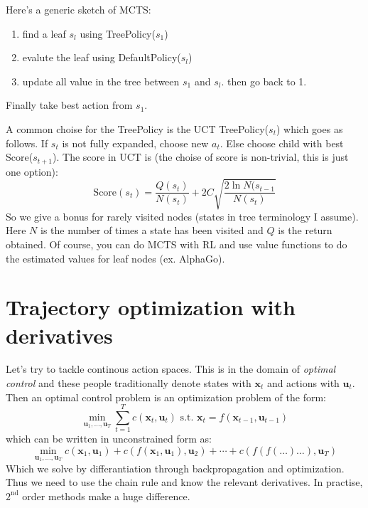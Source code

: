 \documentclass{report}
\begin{document}
Here's a generic sketch of MCTS:
\begin{enumerate}
		\item find a leaf $s_l$ using TreePolicy($s_1$)
		\item evalute the leaf using DefaultPolicy($s_l$)
		\item update all value in the tree between $s_1$ and $s_l$. then go back to 1.
\end{enumerate}
Finally take best action from $s_1$.

A common choise for the TreePolicy is the UCT TreePolicy($s_t$)
which goes as follows. If $s_t$ is not fully expanded, choose new $a_t$. Else 
choose child with best Score($s_{t+1}$).
The score in UCT is (the choise of score is non-trivial, this is just one option):
\begin{equation}
		\text{Score}(s_t) = \frac{Q(s_t)}{N(s_t)} + 2C \sqrt{ \frac{2 \ln N(s_{t-1}}{N(s_t)}  } 
\end{equation}
So we give a bonus for rarely visited nodes (states in tree terminology I assume).
Here $N$ is the number of times a state has been visited and $Q$ is the return obtained.
Of course, you can do MCTS with RL and use value functions to do the estimated values for leaf nodes (ex. AlphaGo).

\section{Trajectory optimization with derivatives}
Let's try to tackle continous action spaces.
This is in the domain of \textit{optimal control} and these people traditionally
denote states with $ \bm{x}_{t}  $ and actions with $ \bm{u}_{t}  $.
Then an optimal control problem is an optimization problem of the form:
\begin{equation}
		\min_{\bm{u}_{1}, \dots, \bm{u}_{T}} \sum_{t=1}^{T} c(\bm{x}_{t}, \bm{u}_{t} ) \text{ s.t. } \bm{x}_{t} = f (\bm{x}_{t-1}, \bm{u}_{t-1} )
\end{equation}
which can be written in unconstrained form as:
\begin{equation}
		\min_{\bm{u}_{1}, \dots, \bm{u}_{T}} 
		c (\bm{x}_{1}, \bm{u}_{1} ) + c (f(\bm{x}_{1}, \bm{u}_{1} ), \bm{u}_{2}) + \cdots + c ( f  (f ( \dots) \dots), \bm{u}_{T}) 
\end{equation}
Which we solve by differantiation through backpropagation and optimization.
Thus we need to use the chain rule and know the relevant derivatives.
In practise, $ 2^{ \text{nd} }  $ order methods make a huge difference.
\end{document}
